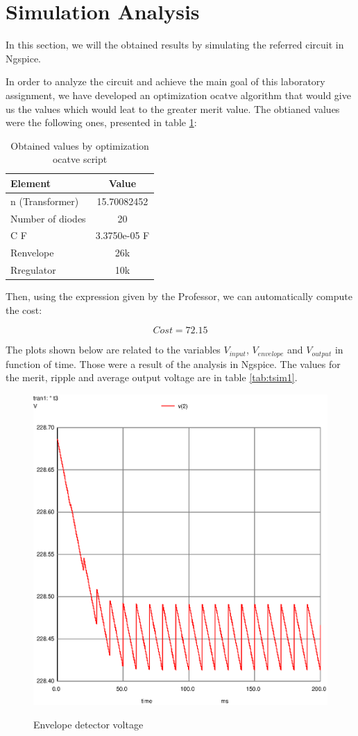 \newpage

\section{Simulation Analysis}
\label{sec:simulation}

In this section, we will the obtained results by simulating the referred circuit in Ngspice. 

In order to analyze the circuit and achieve the main goal of this laboratory assignment, we have developed an optimization ocatve algorithm that would give us the values which would leat to the greater merit value. The obtianed values were the following ones, presented in table \ref{tab:vsim1}:

\begin{table}[h]
    \centering
    \begin{tabular}{|l|c|}
    \hline
    {\bf Element } & {\bf Value} \\
    \hline \hline
    n (Transformer) & 15.70082452 \\
    \hline
    Number of diodes & 20 \\
    \hline
    C F & 3.3750e-05 F \\
    \hline
    Renvelope & 26k \\
    \hline
    Rregulator  & 10k \\
    \hline
    \end{tabular}
    \caption{Obtained values by optimization ocatve script}
    \label{tab:vsim1}
\end{table}

Then, using the expression given by the Professor, we can automatically compute the cost: 

\begin{equation}
    Cost = 72.15 
    \label{eq:Cost}
\end{equation}

The plots shown below are related to the variables $V_{input}$, $V_{envelope}$ and $V_{output}$ in function of time. Those were a result of the analysis in Ngspice. The values for the merit, ripple and average output voltage are in table \ref{tab:tsim1}.

\begin{figure}[!ht] \centering
\caption{Envelope detector voltage}
\includegraphics[width=0.6\linewidth]{venv.eps}
\label{fig:gteo1}
\end{figure}

